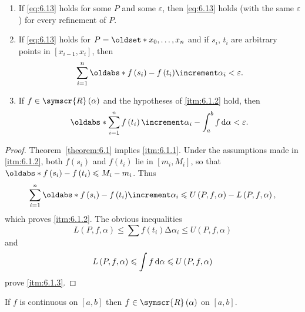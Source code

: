 \begin{theorem}
    \leavevmode
    \begin{enumerate}
        \item\label{itm:6.1.1} If \eqref{eq:6.13} holds for some \(P\) and some \(\varepsilon\), then \eqref{eq:6.13} holds (with the same \(\varepsilon\)) for every refinement of \(P\).
        \item\label{itm:6.1.2} If \eqref{eq:6.13} holds for \(P=\set{x_0,\ldots,x_n}\) and if \(s_i\), \(t_i\) are arbitrary points in \(\left[x_{i-1},x_i\right]\), then
        \begin{equation*}
            \sum_{i=1}^n\abs[f\left(s_i\right)-f\left(t_i\right)]\increment\alpha_i<\varepsilon.
        \end{equation*}
        \item\label{itm:6.1.3} If \(f\in\symscr{R}\left(\alpha\right)\) and the hypotheses of \ref{itm:6.1.2} hold, then
        \begin{equation*}
            \abs[\sum_{i=1}^nf\left(t_i\right)\increment\alpha_i-\int_a^bf\odif{\alpha}]<\varepsilon.
        \end{equation*}
    \end{enumerate}
\end{theorem}

\begin{proof}
    Theorem~\ref{theorem:6.1} implies \ref{itm:6.1.1}. Under the assumptions made in \ref{itm:6.1.2}, both \(f\left(s_i\right)\) and \(f\left(t_i\right)\) lie in \(\left[m_i,M_i\right]\), so that \(\abs[f\left(s_i\right)-f\left(t_i\right)]\leqslant M_i-m_i\). Thus
    \begin{equation*}
        \sum_{i=1}^n\abs[f\left(s_i\right)-f\left(t_i\right)]\increment\alpha_i\leqslant U\left(P,f,\alpha\right)-L\left(P,f,\alpha\right),
    \end{equation*}
    which proves \ref{itm:6.1.2}. The obvious inequalities
    \begin{equation*}
        L\left(P,f,\alpha\right)\leqslant\sum f\left(t_i\right)\increment\alpha_i\leqslant U\left(P,f,\alpha\right)
    \end{equation*}
    and
    \begin{equation*}
        L\left(P,f,\alpha\right)\leqslant\int f\odif{\alpha}\leqslant U\left(P,f,\alpha\right)
    \end{equation*}
    prove \ref{itm:6.1.3}.
\end{proof}

\begin{theorem}\label{theorem:6.5}
    If \(f\) is continuous on \(\left[a,b\right]\) then \(f\in\symscr{R}\left(\alpha\right)\) on \(\left[a,b\right]\).
\end{theorem}

